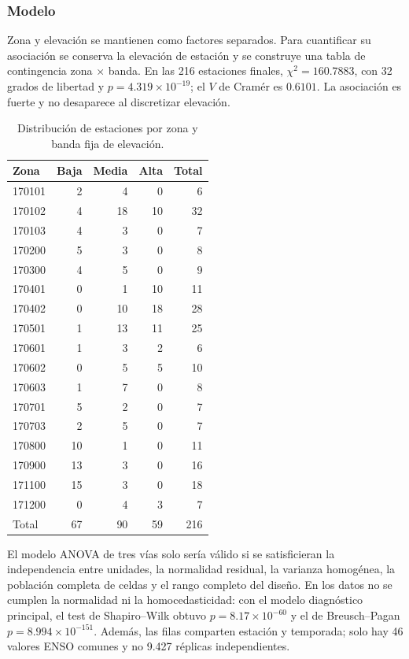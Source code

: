 \documentclass{article}
\begin{document}
\subsubsection{Modelo}
Zona y elevación se mantienen como factores separados. Para cuantificar su asociación se conserva la elevación de estación y se construye una tabla de contingencia zona $\times$ banda. En las 216 estaciones finales, $\chi^2=160.7883$, con 32 grados de libertad y $p=4.319\times10^{-19}$; el $V$ de Cramér es $0.6101$. La asociación es fuerte y no desaparece al discretizar elevación.
\begin{table}[ht]
\centering
\small
\begin{tabular}{lrrrr}
\toprule
Zona & Baja & Media & Alta & Total \\
\midrule
170101 & 2 & 4 & 0 & 6 \\
170102 & 4 & 18 & 10 & 32 \\
170103 & 4 & 3 & 0 & 7 \\
170200 & 5 & 3 & 0 & 8 \\
170300 & 4 & 5 & 0 & 9 \\
170401 & 0 & 1 & 10 & 11 \\
170402 & 0 & 10 & 18 & 28 \\
170501 & 1 & 13 & 11 & 25 \\
170601 & 1 & 3 & 2 & 6 \\
170602 & 0 & 5 & 5 & 10 \\
170603 & 1 & 7 & 0 & 8 \\
170701 & 5 & 2 & 0 & 7 \\
170703 & 2 & 5 & 0 & 7 \\
170800 & 10 & 1 & 0 & 11 \\
170900 & 13 & 3 & 0 & 16 \\
171100 & 15 & 3 & 0 & 18 \\
171200 & 0 & 4 & 3 & 7 \\
\midrule
Total & 67 & 90 & 59 & 216 \\
\bottomrule
\end{tabular}
\caption{Distribución de estaciones por zona y banda fija de elevación.}
\label{tab:contingency}
\end{table}

El modelo ANOVA de tres vías solo sería válido si se satisficieran la independencia entre unidades, la normalidad residual, la varianza homogénea, la población completa de celdas y el rango completo del diseño. En los datos no se cumplen la normalidad ni la homocedasticidad: con el modelo diagnóstico principal, el test de Shapiro--Wilk obtuvo $p=8.17\times10^{-60}$ y el de Breusch--Pagan $p=8.994\times10^{-151}$. Además, las filas comparten estación y temporada; solo hay 46 valores ENSO comunes y no 9.427 réplicas independientes.
\end{document}
